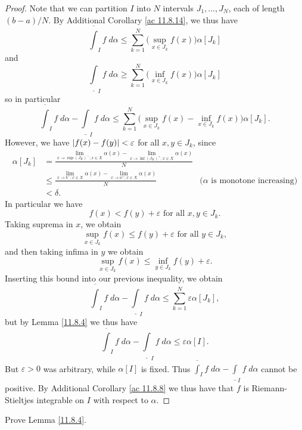 \begin{proof}
    Note that we can partition \(I\) into \(N\) intervals \(J_1, \dots, J_N\), each of length \((b - a) / N\).
    By Additional Corollary \ref{ac 11.8.14}, we thus have
    \[
        \overline{\int}_I f \; d \alpha \leq \sum_{k = 1}^N \big(\sup_{x \in J_k} f(x)\big) \alpha[J_k]
    \]
    and
    \[
        \underline{\int}_I f \; d \alpha \geq \sum_{k = 1}^N \big(\inf_{x \in J_k} f(x)\big) \alpha[J_k]
    \]
    so in particular
    \[
        \overline{\int}_I f \; d \alpha - \underline{\int}_I f \; d \alpha \leq \sum_{k = 1}^N \big(\sup_{x \in J_k} f(x) - \inf_{x \in J_k} f(x)\big) \alpha[J_k].
    \]
    However, we have \(\left\lvert f(x) - f(y)\right\rvert < \varepsilon\) for all \(x, y \in J_k\), since
    \begin{align*}
        \alpha[J_k] & = \frac{\lim_{x \to \sup(J_K)^- ; x \in X} \alpha(x) - \lim_{x \to \inf(J_K)^+ ; x \in X} \alpha(x)}{N}                                              \\
                    & \leq \frac{\lim_{x \to b^- ; x \in X} \alpha(x) - \lim_{x \to a^+ ; x \in X} \alpha(x)}{N}              & \text{(\(\alpha\) is monotone increasing)} \\
                    & < \delta.
    \end{align*}
    In particular we have
    \[
        f(x) < f(y) + \varepsilon \text{ for all } x, y \in J_k.
    \]
    Taking suprema in \(x\), we obtain
    \[
        \sup_{x \in J_k} f(x) \leq f(y) + \varepsilon \text{ for all } y \in J_k,
    \]
    and then taking infima in \(y\) we obtain
    \[
        \sup_{x \in J_k} f(x) \leq \inf_{y \in J_k} f(y) + \varepsilon.
    \]
    Inserting this bound into our previous inequality, we obtain
    \[
        \overline{\int}_I f \; d \alpha - \underline{\int}_I f \; d \alpha \leq \sum_{k = 1}^N \varepsilon \alpha[J_k],
    \]
    but by Lemma \ref{11.8.4} we thus have
    \[
        \overline{\int}_I f \; d \alpha - \underline{\int}_I f \; d \alpha \leq \varepsilon \alpha[I].
    \]
    But \(\varepsilon > 0\) was arbitrary, while \(\alpha[I]\) is fixed.
    Thus \(\overline{\int}_I f \; d \alpha - \underline{\int}_I f \; d \alpha\) cannot be positive.
    By Additional Corollary \ref{ac 11.8.8} we thus have that \(f\) is Riemann-Stieltjes integrable on \(I\) with respect to \(\alpha\).
\end{proof}

\exercisesection

\begin{exercise}\label{ex 11.8.1}
    Prove Lemma \ref{11.8.4}.
\end{exercise}

